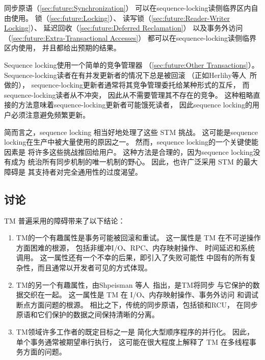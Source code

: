 同步原语（\cref{sec:future:Synchronization}）
可以在sequence-locking读侧临界区内自由使用。
锁（\cref{sec:future:Locking}）、
读写锁（\cref{sec:future:Reader-Writer Locking}）、
延迟回收（\cref{sec:future:Deferred Reclamation}）
以及事务外访问
（\cref{sec:future:Extra-Transactional Accesses}）
都可以在sequence-locking读侧临界区内使用，
并且都给出预期的结果。

Sequence locking使用一个简单的竞争管理器
（\cref{sec:future:Other Transactions}）。
Sequence-locking读者在有并发更新者的情况下总是被回滚
（正如Herlihy等人~\cite{HerlihyLMS03}所做的），
sequence-locking更新者通常将其竞争管理委托给某种形式的互斥，
而sequence-locking读者从不冲突，
因此从不需要管理其不存在的竞争。
这种粗略直接的方法意味着sequence-locking更新者可能饿死读者，
因此sequence locking的用户必须注意避免频繁更新。

简而言之，sequence locking 相当好地处理了这些 STM 挑战。
这可能是sequence locking在生产中被大量使用的原因之一。
然而，sequence locking的一个关键使能因素是
将许多这些挑战推回给用户。
这种方法是合理的，因为sequence locking没有成为
统治所有同步机制的唯一机制的野心。
因此，也许广泛采用 STM 的最大障碍是
其支持者对完全通用性的过度渴望。

\subsection{讨论}
\label{sec:future:Discussion}

TM 普遍采用的障碍带来了以下结论：

\begin{enumerate}
\item	TM的一个有趣属性是事务可能被回滚和重试。
	这一属性是 TM 在不可逆操作方面困难的根源，
	包括非缓冲I/O、RPC、内存映射操作、
	时间延迟和系统调用。
	这一属性还有一个不幸的后果，即引入了失败可能性
	中固有的所有复杂性，而且通常以开发者可见的方式体现。
\item	TM的另一个有趣属性，由Shpeisman
	等人~\cite{TatianaShpeisman2009CppTM}指出，是TM将同步
	与它保护的数据交织在一起。
	这一属性是 TM 在 I/O、内存映射操作、事务外访问
	和调试断点方面问题的根源。
	相比之下，传统的同步原语，包括锁和RCU，
	在同步原语和它们保护的数据之间保持清晰的分离。
\item	TM领域许多工作者的既定目标之一是
	简化大型顺序程序的并行化。
	因此，单个事务通常被期望串行执行，
	这可能在很大程度上解释了 TM 在多线程事务方面的问题。
\end{enumerate}

\QuickQuizEnd


